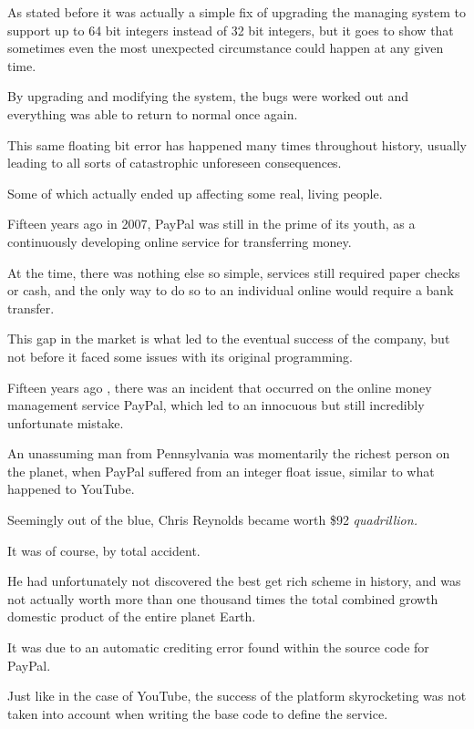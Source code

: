 \documentclass{article}
\begin{document}
\medskip\noindent
As stated before it was actually a simple fix of upgrading the managing system to support up to 64 bit integers instead of 32 bit integers, but it goes to show that sometimes even the most unexpected circumstance could happen at any given time. 

\medskip\noindent
By upgrading and modifying the system, the bugs were worked out and everything was able to return to normal once again.

\medskip\noindent
This same floating bit error has happened many times throughout history, usually leading to all sorts of catastrophic unforeseen consequences. 

\medskip\noindent
Some of which actually ended up affecting some real, living people. 

\medskip\noindent
Fifteen years ago in 2007, PayPal was still in the prime of its youth, as a continuously developing online service for transferring money. 

\medskip\noindent
At the time, there was nothing else so simple, services still required paper checks or cash, and the only way to do so to an individual online would require a bank transfer. 

\medskip\noindent
This gap in the market is what led to the eventual success of the company, but not before it faced some issues with its original programming. 

\medskip\noindent
Fifteen years ago \cite{FB}, there was an incident that occurred on the online money management service PayPal, which led to an innocuous but still incredibly unfortunate mistake. 

\medskip\noindent
An unassuming man from Pennsylvania was momentarily the richest person on the planet, when PayPal suffered from an integer float issue, similar to what happened to YouTube. 

\medskip\noindent
Seemingly out of the blue, Chris Reynolds became worth \$92 \textit{quadrillion.} 

\medskip\noindent
It was of course, by total accident. 

\medskip\noindent
He had unfortunately not discovered the best get rich scheme in history, and was not actually worth more than one thousand times the total combined growth domestic product of the entire planet Earth.

\medskip\noindent
It was due to an automatic crediting error found within the source code for PayPal.

\medskip\noindent
Just like in the case of YouTube, the success of the platform skyrocketing was not taken into account when writing the base code to define the service.
\end{document}
